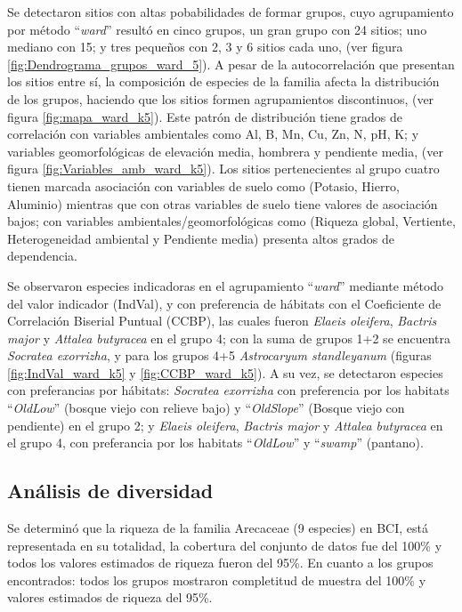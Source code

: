 \documentclass[11pt,]{article}
\begin{document}
Se detectaron sitios con altas pobabilidades de formar grupos, cuyo
agrupamiento por método ``\emph{ward}'' resultó en cinco grupos, un gran
grupo con 24 sitios; uno mediano con 15; y tres pequeños con 2, 3 y 6
sitios cada uno, (ver figura \ref{fig:Dendrograma_grupos_ward_5}). A
pesar de la autocorrelación que presentan los sitios entre sí, la
composición de especies de la familia afecta la distribución de los
grupos, haciendo que los sitios formen agrupamientos discontinuos, (ver
figura \ref{fig:mapa_ward_k5}). Este patrón de distribución tiene grados
de correlación con variables ambientales como Al, B, Mn, Cu, Zn, N, pH,
K; y variables geomorfológicas de elevación media, hombrera y pendiente
media, (ver figura \ref{fig:Variables_amb_ward_k5}). Los sitios
pertenecientes al grupo cuatro tienen marcada asociación con variables
de suelo como (Potasio, Hierro, Aluminio) mientras que con otras
variables de suelo tiene valores de asociación bajos; con variables
ambientales/geomorfológicas como (Riqueza global, Vertiente,
Heterogeneidad ambiental y Pendiente media) presenta altos grados de
dependencia.

Se observaron especies indicadoras en el agrupamiento ``\emph{ward}''
mediante método del valor indicador (IndVal), y con preferencia de
hábitats con el Coeficiente de Correlación Biserial Puntual (CCBP), las
cuales fueron \emph{Elaeis oleifera}, \emph{Bactris major} y
\emph{Attalea butyracea} en el grupo 4; con la suma de grupos 1+2 se
encuentra \emph{Socratea exorrizha}, y para los grupos 4+5
\emph{Astrocaryum standleyanum} (figuras \ref{fig:IndVal_ward_k5} y
\ref{fig:CCBP_ward_k5}). A su vez, se detectaron especies con
preferancias por hábitats: \emph{Socratea exorrizha} con preferencia por
los habitats ``\emph{OldLow}'' (bosque viejo con relieve bajo) y
``\emph{OldSlope}'' (Bosque viejo con pendiente) en el grupo 2; y
\emph{Elaeis oleifera}, \emph{Bactris major} y \emph{Attalea butyracea}
en el grupo 4, con preferancia por los habitats ``\emph{OldLow}'' y
``\emph{swamp}'' (pantano).

\subsection{Análisis de diversidad}\label{anuxe1lisis-de-diversidad}

Se determinó que la riqueza de la familia Arecaceae (9 especies) en BCI,
está representada en su totalidad, la cobertura del conjunto de datos
fue del 100\% y todos los valores estimados de riqueza fueron del 95\%.
En cuanto a los grupos encontrados: todos los grupos mostraron
completitud de muestra del 100\% y valores estimados de riqueza del
95\%.
\end{document}
